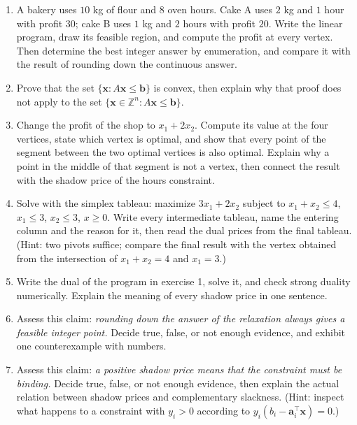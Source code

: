 \begin{latihan}
\begin{enumerate}
  \item A bakery uses $10$ kg of flour and $8$ oven hours. Cake A uses $2$ kg and
        $1$ hour with profit $30$; cake B uses $1$ kg and $2$ hours with profit $20$.
        Write the linear program, draw its feasible region, and compute the profit at every
        vertex. Then determine the best integer answer by enumeration, and compare it
        with the result of rounding down the continuous answer.

  \item Prove that the set $\{\mathbf{x}:A\mathbf{x}\le\mathbf{b}\}$ is convex, then
        explain why that proof does not apply to the set
        $\{\mathbf{x}\in\mathbb{Z}^{n}:A\mathbf{x}\le\mathbf{b}\}$.

  \item Change the profit of the shop to $x_{1}+2x_{2}$. Compute its value at the four vertices,
        state which vertex is optimal, and show that every point of the segment between the two
        optimal vertices is also optimal. Explain why a point in the middle of that segment is
        not a vertex, then connect the result with the shadow price of the hours constraint.

  \item Solve with the simplex tableau: maximize $3x_{1}+2x_{2}$ subject to
        $x_{1}+x_{2}\le4$, $x_{1}\le3$, $x_{2}\le3$, $x\ge0$. Write every intermediate tableau,
        name the entering column and the reason for it, then read the dual prices from the final
        tableau. (Hint: two pivots suffice; compare the final result with the vertex obtained
        from the intersection of $x_{1}+x_{2}=4$ and $x_{1}=3$.)

  \item Write the dual of the program in exercise 1, solve it, and check strong duality
        numerically. Explain the meaning of every shadow price in one sentence.

  \item Assess this claim: \emph{rounding down the answer of the relaxation always gives a
        feasible integer point.} Decide true, false, or not enough evidence, and
        exhibit one counterexample with numbers.

  \item Assess this claim: \emph{a positive shadow price means that the constraint must be
        binding.} Decide true, false, or not enough evidence, then explain the actual relation
        between shadow prices and complementary slackness.
        (Hint: inspect what happens to a constraint with $y_{i}>0$ according to
        $y_{i}(b_{i}-\mathbf{a}_{i}^{\top}\mathbf{x})=0$.)


\end{enumerate}
\end{latihan}

